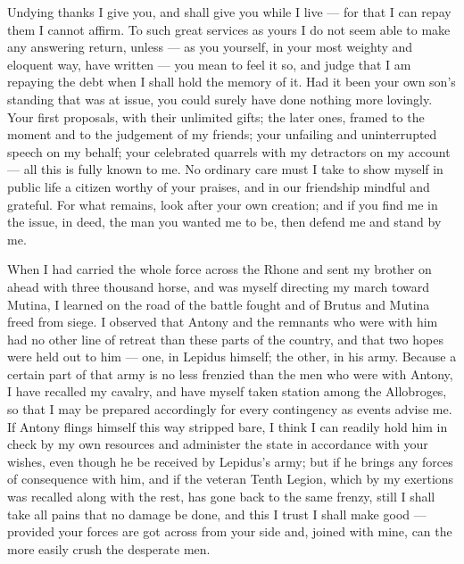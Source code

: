 

 Undying thanks I give you, and shall give you while I live --- for that I can repay them I cannot affirm. To such great services as yours I do not seem able to make any answering return, unless --- as you yourself, in your most weighty and eloquent way, have written --- you mean to feel it so, and judge that I am repaying the debt when I shall hold the memory of it. Had it been your own son's standing that was at issue, you could surely have done nothing more lovingly. Your first proposals, with their unlimited gifts; the later ones, framed to the moment and to the judgement of my friends; your unfailing and uninterrupted speech on my behalf; your celebrated quarrels with my detractors on my account --- all this is fully known to me. No ordinary care must I take to show myself in public life a citizen worthy of your praises, and in our friendship mindful and grateful. For what remains, look after your own creation; and if you find me in the issue, in deed, the man you wanted me to be, then defend me and stand by me.

 When I had carried the whole force across the Rhone and sent my brother on ahead with three thousand horse, and was myself directing my march toward Mutina, I learned on the road of the battle fought and of Brutus and Mutina freed from siege. I observed that Antony and the remnants who were with him had no other line of retreat than these parts of the country, and that two hopes were held out to him --- one, in Lepidus himself; the other, in his army. Because a certain part of that army is no less frenzied than the men who were with Antony, I have recalled my cavalry, and have myself taken station among the Allobroges, so that I may be prepared accordingly for every contingency as events advise me. If Antony flings himself this way stripped bare, I think I can readily hold him in check by my own resources and administer the state in accordance with your wishes, even though he be received by Lepidus's army; but if he brings any forces of consequence with him, and if the veteran Tenth Legion, which by my exertions was recalled along with the rest, has gone back to the same frenzy, still I shall take all pains that no damage be done, and this I trust I shall make good --- provided your forces are got across from your side and, joined with mine, can the more easily crush the desperate men.

